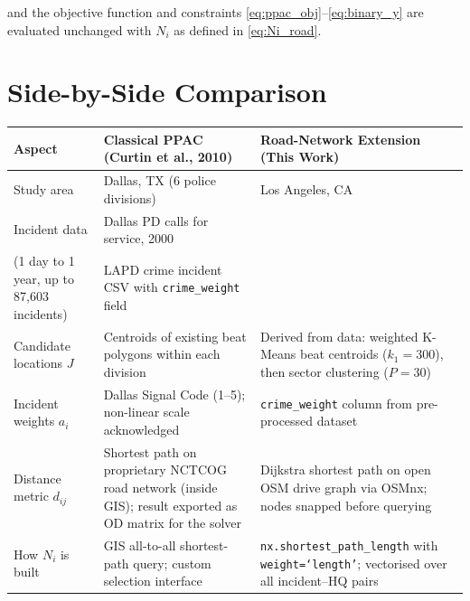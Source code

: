 \documentclass[12pt]{article}
\begin{document}
and the objective function and constraints \eqref{eq:ppac_obj}--\eqref{eq:binary_y}
are evaluated unchanged with $N_i$ as defined in \eqref{eq:Ni_road}.

\section{Side-by-Side Comparison}

\begin{table}[h]
\centering
\renewcommand{\arraystretch}{1.4}
\begin{tabularx}{\textwidth}{@{} l X X @{}}
\toprule
\textbf{Aspect}
    & \textbf{\color{ppacblue}Classical PPAC}
      \textcolor{ppacblue}{(Curtin et al., 2010)}
    & \textbf{\color{roadgreen}Road-Network Extension}
      \textcolor{roadgreen}{(This Work)} \\
\midrule

Study area
    & Dallas, TX (6 police divisions)
    & Los Angeles, CA \\

\addlinespace
Incident data
    & Dallas PD calls for service, 2000\\  (1 day to 1 year, up to 87,603 incidents)
    & LAPD crime incident CSV with \texttt{crime\_weight} field \\

\addlinespace
Candidate locations $J$
    & Centroids of existing beat polygons within each division
    & Derived from data: weighted K-Means beat centroids ($k_1 = 300$),
      then sector clustering ($P = 30$) \\

\addlinespace
Incident weights $a_i$
    & Dallas Signal Code (1--5); non-linear scale acknowledged
    & \texttt{crime\_weight} column from pre-processed dataset \\

\addlinespace
Distance metric $d_{ij}$
    & Shortest path on proprietary NCTCOG road network (inside GIS);
      result exported as OD matrix for the solver
    & Dijkstra shortest path on open OSM drive graph via OSMnx;
      nodes snapped before querying \\

\addlinespace
How $N_i$ is built
    & GIS all-to-all shortest-path query; custom selection interface
    & \texttt{nx.shortest\_path\_length} with \texttt{weight=`length'};
      vectorised over all incident--HQ pairs \\


\end{tabularx}
\end{table}
\end{document}
